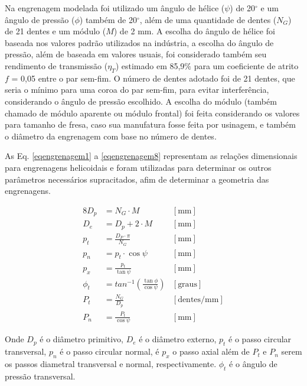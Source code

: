 Na engrenagem modelada foi utilizado um ângulo de hélice ($\psi$) de 20$^{\circ}$ e um ângulo de pressão ($\phi$) também de 20$^{\circ}$, além de uma quantidade de dentes ($N_G$) de 21 dentes e um módulo ($M$) de 2 mm. A escolha do ângulo de hélice foi baseada nos valores padrão utilizados na indústria, a escolha do ângulo de pressão, além de baseada em valores usuais, foi considerado também seu rendimento de transmissão ($\eta_T$) estimado em 85,9$\%$ para um coeficiente de atrito $f$ = 0,05 entre o par sem-fim. O número de dentes adotado foi de 21 dentes, que seria o mínimo para uma coroa do par sem-fim, para evitar interferência, considerando o ângulo de pressão escolhido. A escolha do módulo (também chamado de módulo aparente ou módulo frontal) foi feita considerando os valores para tamanho de fresa, caso sua manufatura fosse feita por usinagem, e também o diâmetro da engrenagem com base no número de dentes. \cite{shigley2005}

As Eq. \ref{eqengrenagem1} a \ref{eqengrenagem8} representam as relações dimensionais para engrenagens helicoidais \cite{shigley2005} e foram utilizadas para determinar os outros parâmetros necessários supracitados, afim de determinar a geometria das engrenagens. 

\begin{alignat}{8}
\label{eqengrenagem1}
    D_p & = N_G \cdot M & [\text{mm}]\\
\label{eqengrenagem2}
    D_e & = D_p + 2 \cdot M & [\text{mm}] \\
\label{eqengrenagem3}
    p_t & = \frac{D_P \cdot \pi}{N_G} & [\text{mm}] \\
\label{eqengrenagem4}
    p_n & = p_t \cdot \cos{\psi} & [\text{mm}] \\
\label{eqengrenagem5}
    p_x & = \frac{p_t}{\tan{\psi}} & [\text{mm}]\\
\label{eqengrenagem6}
    \phi_t & = tan^{-1}\left(\frac{\tan{\phi}}{\cos{\psi}}\right) & [\text{graus}] \\
\label{eqengrenagem7}
    P_t & = \frac{N_G}{D_p} & [\text{dentes/mm}]\\
\label{eqengrenagem8}
    P_n & = \frac{P_t}{\cos{\psi}} & [\text{mm}]
\end{alignat}


Onde $D_p$ é o diâmetro primitivo, $D_e$ é o diâmetro externo, $p_t$ é o passo circular transversal, $p_n$ é o passo circular normal, é $p_x$ o passo axial além de $P_t$ e $P_n$ serem os passos diametral transversal e normal, respectivamente. $\phi_t$ é o ângulo de pressão transversal. 

